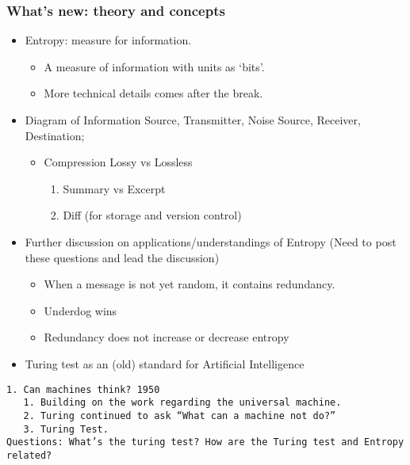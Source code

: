 \documentclass[12pt]{article}
\theoremstyle{definition}
\theoremstyle{plain}
\begin{document}
\subsubsection{What's new: theory and concepts}
\begin{itemize}
    \item Entropy: measure for information.
        \begin{itemize}
            \item A measure of information with units as `bits'.
            \item More technical details comes after the break. %

        \end{itemize}
    \item Diagram of Information Source, Transmitter, Noise Source, Receiver,
        Destination;
        \begin{itemize}
            \item Compression Lossy vs Lossless
                \begin{enumerate}
                    \item  Summary vs Excerpt
                    \item Diff (for storage and version control)
                \end{enumerate}
        \end{itemize}
    \item Further discussion on applications/understandings of Entropy (Need to
        post these questions and lead the discussion)
        \begin{itemize}
            \item When a message is not yet random, it contains redundancy.
            \item {Underdog wins}
            \item {Redundancy does not increase or decrease entropy}
        \end{itemize}
    \item Turing test as an (old) standard for Artificial Intelligence
\end{itemize}


\begin{verbatim}
1. Can machines think? 1950
   1. Building on the work regarding the universal machine.
   2. Turing continued to ask “What can a machine not do?”
   3. Turing Test.
Questions: What’s the turing test? How are the Turing test and Entropy related?
\end{verbatim}
\end{document}
